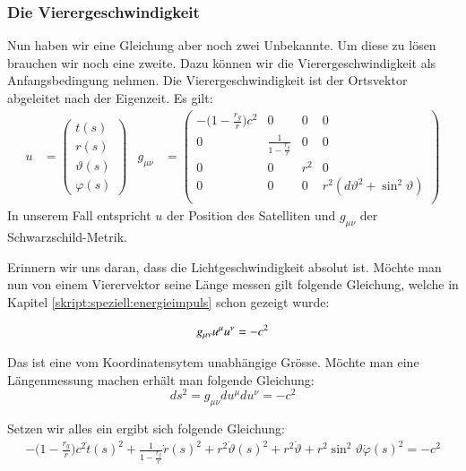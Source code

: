 \begin{refsection}
\subsubsection{Die Vierergeschwindigkeit}
Nun haben wir eine Gleichung aber noch zwei Unbekannte. Um diese zu lösen brauchen wir noch eine zweite. Dazu können wir die Vierergeschwindigkeit als Anfangsbedingung nehmen. Die Vierergeschwindigkeit ist der Ortsvektor abgeleitet nach der Eigenzeit. Es gilt:
\begin{align*}
u &= 
\begin{pmatrix}
t(s) \\
r(s) \\
\vartheta (s) \\
\varphi (s)
\end{pmatrix} &
g_{\mu\nu} &= 
\begin{pmatrix}
-\biggl(1-\frac{r_g}r\biggr)c^2 & 0 & 0 & 0 \\
0 & \frac1{\displaystyle 1-\frac{r_g}r} & 0 & 0 \\
0 & 0 & r^2 & 0 \\
0 & 0 & 0 & r^2(d\vartheta^2 + \sin^2\vartheta) \\
\end{pmatrix}
\end{align*}
In unserem Fall entspricht \( u \) der Position des Satelliten und \( g_{\mu\nu} \) der Schwarzschild-Metrik. 

Erinnern wir uns daran, dass die Lichtgeschwindigkeit absolut ist. Möchte man nun von einem Vierervektor seine Länge messen gilt folgende Gleichung, welche in Kapitel \ref{skript:speziell:energieimpuls} schon gezeigt wurde:

\begin{equation}
g_{\mu\nu}u^\mu u^\nu=-c^2 \\
\end{equation}

\noindent{}Das ist eine vom Koordinatensytem unabhängige Grösse. Möchte man eine Längenmessung machen erhält man folgende Gleichung: \\

\begin{equation}
ds^2 = g_{\mu\nu}du^\mu du^\nu = -c^2
\end{equation}

\noindent{}Setzen wir alles ein ergibt sich folgende Gleichung:
\begin{align*}
-\biggl(1-\frac{r_g}r\biggr)c^2 \dot t(s)^2 + \frac1{\displaystyle 1-\frac{r_g}r} \dot r(s)^2 + r^2 \dot \vartheta(s)^2 + r^2 \dot \vartheta + r^2 \sin^2 \vartheta \dot \varphi (s)^2 = -c^2
\end{align*}


\end{refsection}
